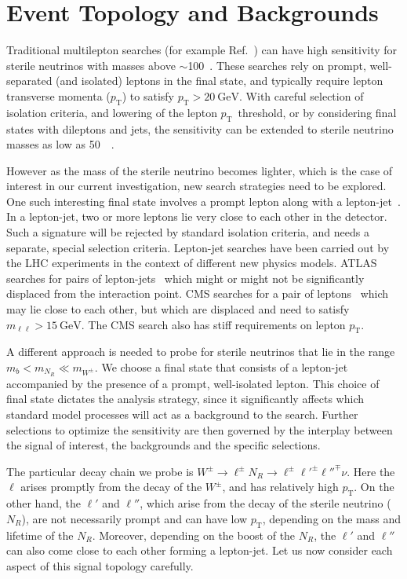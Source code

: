 \documentclass[reprint,doublecolumn,secnumarabic,amssymb, amsmath, aps,nofootinbib,superscriptaddress]{revtex4-1}
\newcommand{\pt}      {\ensuremath{p_{\mathrm{T}}}}
\newcommand{\gev}{~\text{GeV}}
\begin{document}
\section { \label{sec:3} Event Topology and Backgrounds}
\label{sec:3}
Traditional multilepton searches (for example Ref.~\cite{CMS:2017wua, Aad:2014hja})  can have high sensitivity for sterile neutrinos with masses above $\sim$100\gev.
These searches rely on prompt, well-separated (and isolated) leptons in the final state, and typically require lepton transverse momenta (\pt) to satisfy
$\pt > 20\gev$. With careful selection of isolation criteria, and lowering of the lepton \pt\ threshold, or by considering final states with dileptons
and jets, the sensitivity can be extended to sterile neutrino masses as low as 50\gev~\cite{Khachatryan:2015gha, Khachatryan:2016olu}. 

However as the mass of the sterile neutrino becomes lighter, which is the case of interest in our current investigation, new search strategies need to be explored. One such
interesting final state involves a prompt lepton along with a lepton-jet~\cite{Izaguirre:2015pga}. In a lepton-jet, two or more leptons lie very close to each other in the detector. Such a signature will be rejected by standard isolation criteria, and needs a separate, special selection criteria. Lepton-jet 
searches have been carried out by the LHC experiments in the context of different new physics models. ATLAS searches for pairs of lepton-jets~\cite{ATLAS:2016jza} which might or might not be significantly displaced from the interaction
point. CMS searches for a pair of leptons~\cite{CMS:2014hka} which may lie close to each other, but which are displaced and need to satisfy $m_{\ell\ell}>15\gev$. The CMS search also has stiff requirements on lepton \pt.

A different approach is needed to probe for sterile neutrinos that lie in the range $m_b < m_{N_R} \ll m_{W^\pm}$. We choose a final state that
consists of a lepton-jet accompanied by the presence of a prompt, well-isolated lepton. This choice of final state dictates the analysis strategy, since it significantly affects which standard model
processes will act as a background to the search. Further selections to optimize the sensitivity are then governed by the interplay between the signal of interest, the backgrounds
and the specific selections.

The particular decay chain we probe is  $W^\pm \rightarrow \ell^{\pm} N_R \rightarrow \ell^{\pm} \ell'^{\pm}\ell''^{\mp}\nu$. Here the $\ell$
arises promptly from the decay of the $W^\pm$, and has relatively high \pt. On the other hand, the $\ell'$ and $\ell''$, which arise from the decay
of the sterile neutrino ($N_R$), are not necessarily prompt and can have low \pt, depending on the mass and lifetime of the $N_R$. Moreover, depending
on the boost of the $N_R$, the $\ell'$ and $\ell''$ can also come close to each other forming a lepton-jet. Let us now consider each aspect of this signal topology carefully.
\end{document}
